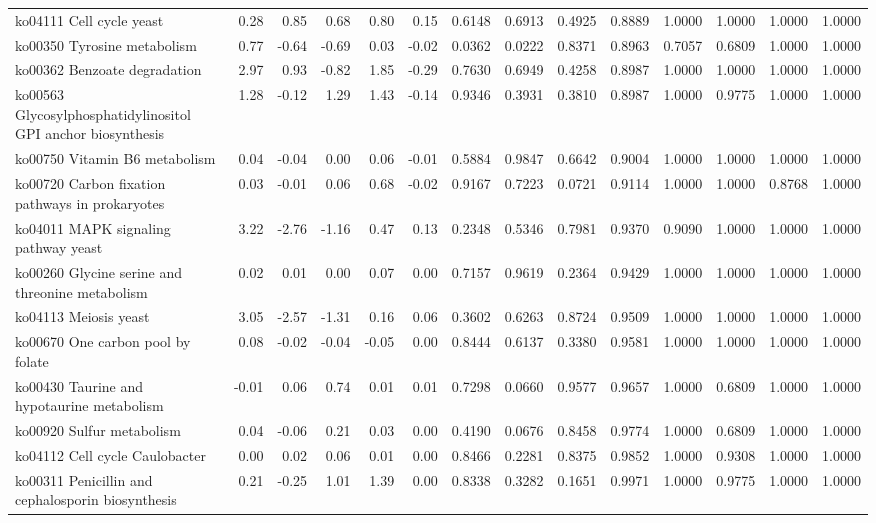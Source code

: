 {\begin{landscape}
\begin{longtable}{ | l | r | r | r | r | r | r  | r | r | r | r | r | r  | r  |}
			ko04111  Cell cycle yeast & 0.28 & 0.85 & 0.68 & 0.80 & 0.15 & 0.6148 & 0.6913 & 0.4925 & 0.8889 & 1.0000 & 1.0000 & 1.0000 & 1.0000 \\ 
			ko00350  Tyrosine metabolism & 0.77 & -0.64 & -0.69 & 0.03 & -0.02 & 0.0362 & 0.0222 & 0.8371 & 0.8963 & 0.7057 & 0.6809 & 1.0000 & 1.0000 \\ 
			ko00362  Benzoate degradation & 2.97 & 0.93 & -0.82 & 1.85 & -0.29 & 0.7630 & 0.6949 & 0.4258 & 0.8987 & 1.0000 & 1.0000 & 1.0000 & 1.0000 \\ 
			ko00563  Glycosylphosphatidylinositol GPI anchor biosynthesis & 1.28 & -0.12 & 1.29 & 1.43 & -0.14 & 0.9346 & 0.3931 & 0.3810 & 0.8987 & 1.0000 & 0.9775 & 1.0000 & 1.0000 \\ 
			ko00750  Vitamin B6 metabolism & 0.04 & -0.04 & 0.00 & 0.06 & -0.01 & 0.5884 & 0.9847 & 0.6642 & 0.9004 & 1.0000 & 1.0000 & 1.0000 & 1.0000 \\ 
			ko00720  Carbon fixation pathways in prokaryotes & 0.03 & -0.01 & 0.06 & 0.68 & -0.02 & 0.9167 & 0.7223 & 0.0721 & 0.9114 & 1.0000 & 1.0000 & 0.8768 & 1.0000 \\ 
			ko04011  MAPK signaling pathway yeast & 3.22 & -2.76 & -1.16 & 0.47 & 0.13 & 0.2348 & 0.5346 & 0.7981 & 0.9370 & 0.9090 & 1.0000 & 1.0000 & 1.0000 \\ 
			ko00260  Glycine serine and threonine metabolism & 0.02 & 0.01 & 0.00 & 0.07 & 0.00 & 0.7157 & 0.9619 & 0.2364 & 0.9429 & 1.0000 & 1.0000 & 1.0000 & 1.0000 \\ 
			ko04113  Meiosis yeast & 3.05 & -2.57 & -1.31 & 0.16 & 0.06 & 0.3602 & 0.6263 & 0.8724 & 0.9509 & 1.0000 & 1.0000 & 1.0000 & 1.0000 \\ 
			ko00670  One carbon pool by folate & 0.08 & -0.02 & -0.04 & -0.05 & 0.00 & 0.8444 & 0.6137 & 0.3380 & 0.9581 & 1.0000 & 1.0000 & 1.0000 & 1.0000 \\ 
			ko00430  Taurine and hypotaurine metabolism & -0.01 & 0.06 & 0.74 & 0.01 & 0.01 & 0.7298 & 0.0660 & 0.9577 & 0.9657 & 1.0000 & 0.6809 & 1.0000 & 1.0000 \\ 
			ko00920  Sulfur metabolism & 0.04 & -0.06 & 0.21 & 0.03 & 0.00 & 0.4190 & 0.0676 & 0.8458 & 0.9774 & 1.0000 & 0.6809 & 1.0000 & 1.0000 \\ 
			ko04112  Cell cycle Caulobacter & 0.00 & 0.02 & 0.06 & 0.01 & 0.00 & 0.8466 & 0.2281 & 0.8375 & 0.9852 & 1.0000 & 0.9308 & 1.0000 & 1.0000 \\ 
			ko00311  Penicillin and cephalosporin biosynthesis & 0.21 & -0.25 & 1.01 & 1.39 & 0.00 & 0.8338 & 0.3282 & 0.1651 & 0.9971 & 1.0000 & 0.9775 & 1.0000 & 1.0000 \\ 

\end{longtable}
\end{landscape}}
